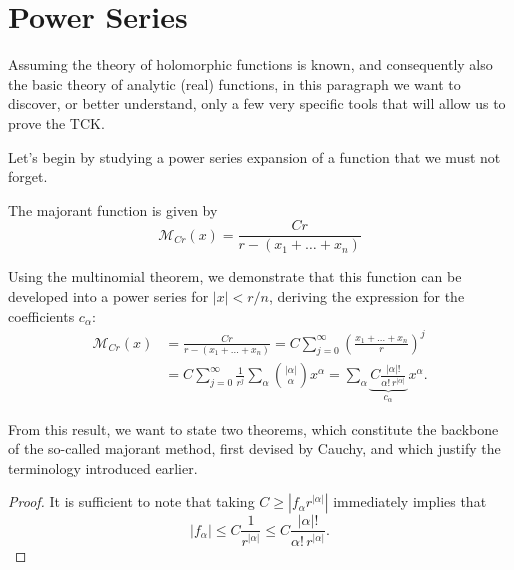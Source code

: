 \newpage
\section{Power Series}\label{powerseries}
Assuming the theory of holomorphic functions is known, and consequently also the basic theory of analytic (real) functions, in this paragraph we want to discover, or better understand, only a few very specific tools that will allow us to prove the TCK.

Let’s begin by studying a power series expansion of a function that we must not forget.
\begin{definition}
The majorant function is given by $$\mathcal{M}_{Cr}(x)=\frac{Cr}{r-(x_1+\ldots +x_n)}$$
\end{definition}
Using the multinomial theorem, we demonstrate that this function can be developed into a power series for $|x|<r/n$, deriving the expression for the coefficients $c_\alpha$:
\begin{align*}
\mathcal{M}_{Cr}(x) &= \frac{Cr}{r-(x_1+\ldots +x_n)} = C \sum\limits_{j=0}^\infty \left(\frac{x_1+\ldots +x_n}{r}\right)^j  \\ 
&= C \sum\limits_{j=0}^\infty \frac{1}{r^j} \sum\limits_\alpha  \binom{|\alpha |}{\alpha } x^\alpha = \sum\limits_\alpha 
\underbrace{C \frac{|\alpha |!}{\alpha ! \, r^{|\alpha |}}}_{c_\alpha} \, x^\alpha .
\end{align*}

From this result, we want to state two theorems, which constitute the backbone of the so-called majorant method, first devised by Cauchy, and which justify the terminology introduced earlier.

\begin{theorem}\label{theomaj}
\end{theorem}

\begin{theorem}\label{constmaj}
\end{theorem}

\begin{proof}
It is sufficient to note that taking $C \geq |f_\alpha r^{|\alpha |}|$ immediately implies that
$$|f_\alpha | \leq C \frac{1}{r^{|\alpha |}} \leq C \frac{|\alpha |!}{\alpha ! \, r^{|\alpha |}}.$$
\end{proof}

